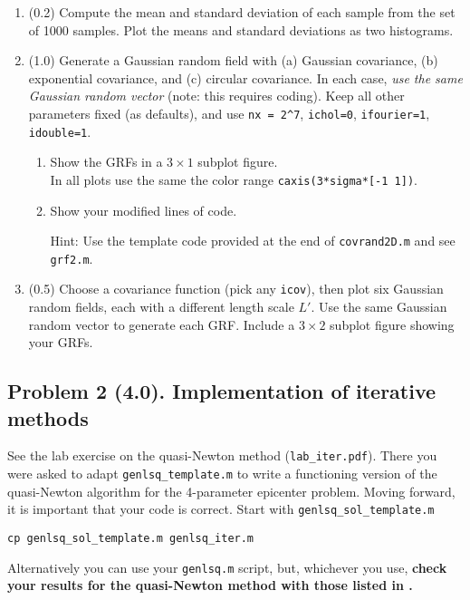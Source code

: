 \documentclass[11pt,titlepage,fleqn]{article}
\begin{document}
\begin{enumerate}
\item (0.2) Compute the mean and standard deviation of each sample from the set of 1000 samples. Plot the means and standard deviations as two histograms.

\item (1.0) Generate a Gaussian random field with (a) Gaussian covariance, (b) exponential covariance, and (c) circular covariance. In each case, {\em use the same Gaussian random vector} (note: this requires coding). Keep all other parameters fixed (as defaults), and use \verb+nx = 2^7+, \verb+ichol=0+, \verb+ifourier=1+, \verb+idouble=1+. 
%
\begin{enumerate}
\item Show the GRFs in a $3 \times 1$ subplot figure. \\
In all plots use the same the color range \verb+caxis(3*sigma*[-1 1])+.

\item Show your modified lines of code.

Hint: Use the template code provided at the end of \verb+covrand2D.m+ and see \verb+grf2.m+.
\end{enumerate}

\item (0.5) Choose a covariance function (pick any \verb+icov+), then plot six Gaussian random fields, each with a different length scale $L'$. Use the same Gaussian random vector to generate each GRF. Include a $3 \times 2$ subplot figure showing your GRFs.

\end{enumerate}


\subsection*{Problem 2 (4.0). Implementation of iterative methods}

See the lab exercise on the quasi-Newton method (\verb+lab_iter.pdf+). There you were asked to adapt \verb+genlsq_template.m+ to write a functioning version of the quasi-Newton algorithm for the 4-parameter epicenter problem. Moving forward, it is important that your code is correct. Start with \verb+genlsq_sol_template.m+
%
\begin{verbatim}
cp genlsq_sol_template.m genlsq_iter.m
\end{verbatim}
%
Alternatively you can use your \verb+genlsq.m+ script, but, whichever you use, {\bf check your results for the quasi-Newton method with those listed in .}
\end{document}

